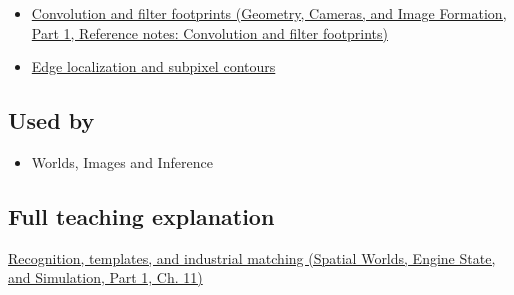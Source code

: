 \begin{itemize}
\tightlist
\item
  \href{../03-Geometry-Cameras-and-Image-Formation-P01/main.pdf\#nameddest=appendix-d5b3c692d9f0}{Convolution and filter footprints (Geometry, Cameras, and Image Formation, Part 1, Reference notes: Convolution and filter footprints)}
\item
  \hyperref[appendix-36022286b03e]{Edge localization and subpixel contours}
\end{itemize}

\subsection{Used by}\label{appendix-5fb4af80d1c7-used-by}

\hypertarget{appendix-5fb4af80d1c7-used-by}{}

\begin{itemize}
\tightlist
\item
  {Worlds, Images and Inference}
\end{itemize}

\subsection{Full teaching explanation}\label{appendix-5fb4af80d1c7-full-teaching-explanation}

\hypertarget{appendix-5fb4af80d1c7-full-teaching-explanation}{}

\href{../05-Spatial-Worlds-Engine-State-and-Simulation-P01/main.pdf\#nameddest=04-visual-computing-ii-ch030-recognition-templates-and-industrial-matching}{Recognition, templates, and industrial matching (Spatial Worlds, Engine State, and Simulation, Part 1, Ch. 11)}
